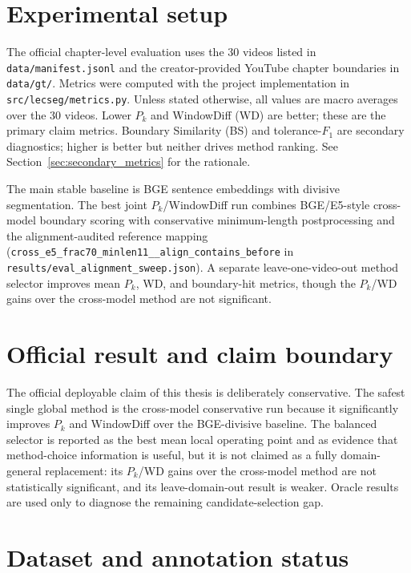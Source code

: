 \section{Experimental setup}
\label{sec:setup}

The official chapter-level evaluation uses the 30 videos listed in
\texttt{data/manifest.jsonl} and the creator-provided YouTube chapter
boundaries in \texttt{data/gt/}. Metrics were computed with the project
implementation in \texttt{src/lecseg/metrics.py}. Unless stated otherwise,
all values are macro averages over the 30 videos. Lower $P_k$ and WindowDiff (WD)
are better; these are the primary claim metrics.
Boundary Similarity (BS) and tolerance-$F_1$ are secondary diagnostics;
higher is better but neither drives method ranking.
See Section~\ref{sec:secondary_metrics} for the rationale.

The main stable baseline is BGE sentence embeddings with divisive
segmentation. The best joint $P_k$/WindowDiff run combines BGE/E5-style
cross-model boundary scoring with conservative minimum-length postprocessing
and the alignment-audited reference mapping
(\texttt{cross\_e5\_frac70\_minlen11\_\_align\_contains\_before} in
\texttt{results/eval\_alignment\_sweep.json}). A separate leave-one-video-out
method selector improves mean $P_k$, WD, and boundary-hit metrics, though the
$P_k$/WD gains over the cross-model method are not significant.

\section{Official result and claim boundary}
\label{sec:official_claim}

The official deployable claim of this thesis is deliberately conservative. The
safest single global method is the cross-model conservative run because it
significantly improves $P_k$ and WindowDiff over the BGE-divisive baseline. The
balanced selector is reported as the best mean local operating point and as
evidence that method-choice information is useful, but it is not claimed as a
fully domain-general replacement: its $P_k$/WD gains over the cross-model method
are not statistically significant, and its leave-domain-out result is weaker.
Oracle results are used only to diagnose the remaining candidate-selection gap.



\section{Dataset and annotation status}
\label{sec:dataset_status}

